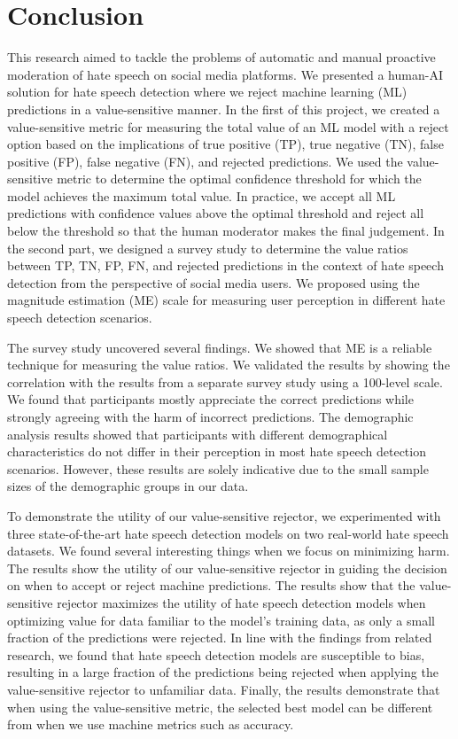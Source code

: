 \chapter{Conclusion}
\label{ch:conclusion}
This research aimed to tackle the problems of automatic and manual proactive moderation of hate speech on social media platforms.
%
We presented a human-AI solution for hate speech detection where we reject machine learning (ML) predictions in a value-sensitive manner.
%
In the first of this project, we created a value-sensitive metric for measuring the total value of an ML model with a reject option based on the implications of true positive (TP), true negative (TN), false positive (FP), false negative (FN), and rejected predictions.
%
We used the value-sensitive metric to determine the optimal confidence threshold for which the model achieves the maximum total value.
%
In practice, we accept all ML predictions with confidence values above the optimal threshold and reject all below the threshold so that the human moderator makes the final judgement.
%
In the second part, we designed a survey study to determine the value ratios between TP, TN, FP, FN, and rejected predictions in the context of hate speech detection from the perspective of social media users.
%
We proposed using the magnitude estimation (ME) scale for measuring user perception in different hate speech detection scenarios.
%

%
The survey study uncovered several findings.
%
We showed that ME is a reliable technique for measuring the value ratios.
%
We validated the results by showing the correlation with the results from a separate survey study using a 100-level scale.
%
We found that participants mostly appreciate the correct predictions while strongly agreeing with the harm of incorrect predictions.
%
The demographic analysis results showed that participants with different demographical characteristics do not differ in their perception in most hate speech detection scenarios.
%
However, these results are solely indicative due to the small sample sizes of the demographic groups in our data.
%

%
To demonstrate the utility of our value-sensitive rejector, we experimented with three state-of-the-art hate speech detection models on two real-world hate speech datasets.
%
We found several interesting things when we focus on minimizing harm.
%
The results show the utility of our value-sensitive rejector in guiding the decision on when to accept or reject machine predictions.
%
The results show that the value-sensitive rejector maximizes the utility of hate speech detection models when optimizing value for data familiar to the model's training data, as only a small fraction of the predictions were rejected.
%
In line with the findings from related research, we found that hate speech detection models are susceptible to bias, resulting in a large fraction of the predictions being rejected when applying the value-sensitive rejector to unfamiliar data.
%
Finally, the results demonstrate that when using the value-sensitive metric, the selected best model can be different from when we use machine metrics such as accuracy.
%
